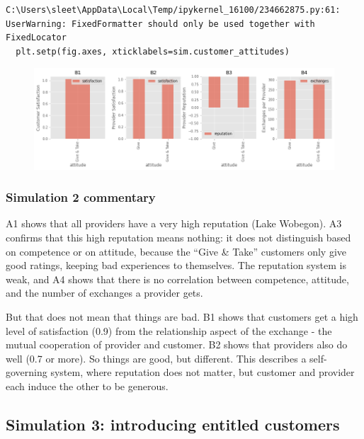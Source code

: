 \documentclass[
  letterpaper,
  DIV=11,
  numbers=noendperiod]{scrartcl}
\begin{document}
\begin{verbatim}
C:\Users\sleet\AppData\Local\Temp/ipykernel_16100/234662875.py:61: UserWarning: FixedFormatter should only be used together with FixedLocator
  plt.setp(fig.axes, xticklabels=sim.customer_attitudes)
\end{verbatim}

\begin{figure}[H]

{\centering \includegraphics{provider-reputation_files/figure-pdf/cell-12-output-3.png}

}

\end{figure}

\hypertarget{simulation-2-commentary}{%
\subsubsection{Simulation 2 commentary}\label{simulation-2-commentary}}

A1 shows that all providers have a very high reputation (Lake Wobegon).
A3 confirms that this high reputation means nothing: it does not
distinguish based on competence or on attitude, because the ``Give \&
Take'' customers only give good ratings, keeping bad experiences to
themselves. The reputation system is weak, and A4 shows that there is no
correlation between competence, attitude, and the number of exchanges a
provider gets.

But that does not mean that things are bad. B1 shows that customers get
a high level of satisfaction (0.9) from the relationship aspect of the
exchange - the mutual cooperation of provider and customer. B2 shows
that providers also do well (0.7 or more). So things are good, but
different. This describes a self-governing system, where reputation does
not matter, but customer and provider each induce the other to be
generous.

\hypertarget{simulation-3-introducing-entitled-customers}{%
\subsection{Simulation 3: introducing entitled
customers}\label{simulation-3-introducing-entitled-customers}}
\end{document}
